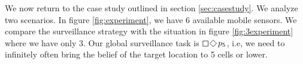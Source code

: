 We now return to the case study outlined in section \ref{sec:casestudy}. We analyze two scenarios. In figure \ref{fig:experiment}, we have 6 available mobile sensors. We compare the surveillance strategy with the situation in figure \ref{fig:3experiment} where we have only 3. Our global surveillance task is $\LTLsquare \LTLdiamond p_5$, i.e, we need to infinitely often bring the belief of the target location to 5 cells or lower. 

\begin{figure}
	\centering
{}
{}
\end{figure}
